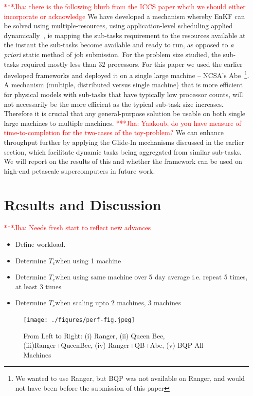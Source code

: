 \documentclass[conference,final]{IEEEtran}
\newcommand{\tc}{$T_c$}
\newcommand{\jhanote}[1]{ {\textcolor{red} { ***Jha: #1 }}}
\begin{document}
\jhanote{there is the following blurb from the ICCS paper whcih we
  should either incorporate or acknowledge} We have developed a
mechanism whereby EnKF can be solved using multiple-resources, using
application-level scheduling applied dynamically~\cite{saga_tg08}, ie
mapping the sub-tasks requirement to the resources available at the
instant the sub-tasks become available and ready to run, as opposed to
{\it a priori} static method of job submission.  For the problem size
studied, the sub-tasks required mostly less than 32 processors. For
this paper we used the earlier developed frameworks and deployed it on
a single large machine -- NCSA's Abe~\footnote{We wanted to use
  Ranger, but BQP was not available on Ranger, and would not have been
  before the submission of this paper}.  A mechanism (multiple,
distributed versus single machine) that is more efficient for physical
models with sub-tasks that have typically low processor counts, will
not necessarily be the more efficient as the typical sub-task size
increases. Therefore it is crucial that any general-purpose solution
be usable on both single large machines to multiple machines.
\jhanote{Yaakoub, do you have measure of time-to-completion for the
  two-cases of the toy-problem?}  We can enhance throughput further by
applying the Glide-In mechanisms discussed in the earlier section,
which facilitate dynamic tasks being aggregated from similar
sub-tasks. We will report on the results of this and whether the
framework can be used on high-end petascale supercomputers in future
work.


\section{Results and Discussion}

\jhanote{Needs fresh start to reflect new advances}

\begin{itemize}
\item Define workload.
\item Determine  \tc when using 1 machine 
\item Determine \tc when using same machine over 5 day average i.e. repeat 5 times, at least 3 times
\item Determine \tc when scaling upto 2 machines, 3 machines 
\end{itemize}

\begin{figure}
\begin{center}
\texttt{[image: ./figures/perf-fig.jpeg]}
\end{center}
\caption{From Left to Right: (i) Ranger, (ii) Queen Bee,
  (iii)Ranger+QueenBee, (iv) Ranger+QB+Abe, (v) BQP-All Machines }
\label{fig:application_architecture}
\end{figure}
\end{document}
